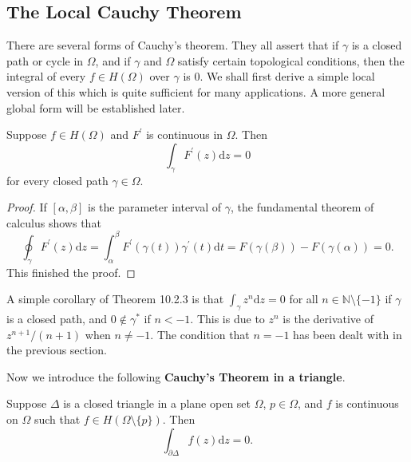 \subsection{The Local Cauchy Theorem}
There are several forms of Cauchy's theorem. They all assert that if $\gamma$ is a closed path or cycle in $\Omega$, and if $\gamma$ and $\Omega$ satisfy certain topological conditions, then the integral of every $f\in H(\Omega)$ over $\gamma$ is $0$. We shall first derive a simple local version of this which is quite sufficient for many applications. A more general global form will be established later.
\begin{theorem}
Suppose $f\in H(\Omega)$ and $F^\prime$ is continuous in $\Omega$. Then 
$$\int_\gamma F^\prime(z)\mathrm{d}z=0$$
for every closed path $\gamma\in\Omega$.
\end{theorem}
\begin{proof}
If $[\alpha,\beta]$ is the parameter interval of $\gamma$, the fundamental theorem of calculus shows that 
$$
\oint_{\gamma}{F^{\prime}\left( z \right) \mathrm{d}z}=\int_{\alpha}^{\beta}{F^{\prime}\left( \gamma \left( t \right) \right) \gamma ^{\prime}\left( t \right) \mathrm{d}t}=F\left( \gamma \left( \beta \right) \right) -F\left( \gamma \left( \alpha \right) \right) =0.
$$
This finished the proof.
\end{proof}
A simple corollary of Theorem 10.2.3 is that $\int_\gamma z^n\mathrm{d}z=0$ for all $n\in\mathbb{N}\setminus\{-1\}$ if $\gamma$ is a closed path, and $0\notin\gamma^*$ if $n<-1$. This is due to $z^n$ is the derivative of $z^{n+1}/(n+1)$ when $n\ne -1$. The condition that $n=-1$ has been dealt with in the previous section.\par
Now we introduce the following \textbf{Cauchy's Theorem in a triangle}.
\begin{theorem}
Suppose $\Delta$ is a closed triangle in a plane open set $\Omega$, $p\in\Omega$, and $f$ is continuous on $\Omega$ such that $f\in H(\Omega\setminus\{p\})$. Then 
$$\int_{\partial\Delta}f(z)\mathrm{d}z=0.$$
\end{theorem}
